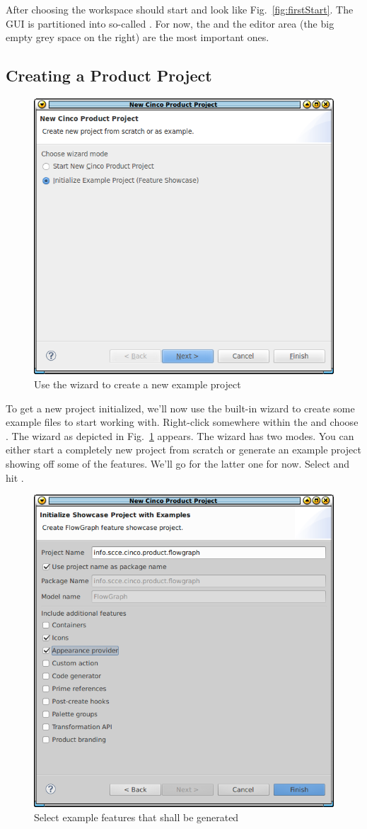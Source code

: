 \documentclass[a4paper,american,12pt]{scrreprt}
\begin{document}
After choosing the workspace \cinco should start and look like
Fig.~\ref{fig:firstStart}. The GUI is partitioned into so-called
. For now, the  and the editor area (the
big empty grey space on the right) are the most important ones. 

\subsection{Creating a \cinco Product Project}
\label{sec:wizard}

\begin{figure}
	\centering
	\includegraphics[width=.5\textwidth]{screenshots/new-cp-wizard.png}
	\caption{Use the wizard to create a new example project}
	\label{fig:cpWizard}
\end{figure}

To get a new  project initialized, we'll now use the
built-in wizard to create some example files to start working with.
Right-click somewhere within the  and choose . The wizard as depicted in Fig.~\ref{fig:cpWizard} appears. The wizard
has two modes. You can either start a completely new project from scratch or
generate an example project showing off some of the \cinco{} features. We'll go for
the latter one for now. Select  and hit . 

\begin{figure}
	\centering
	\includegraphics[width=.5\textwidth]{screenshots/new-cp-wizard2.png}
	\caption{Select example features that shall be generated}
	\label{fig:cpWizard2}
\end{figure}
\end{document}
